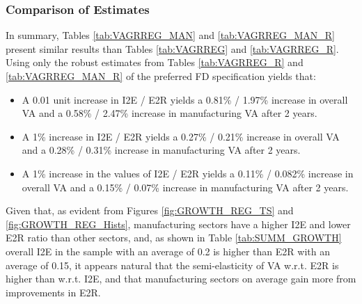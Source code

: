 \documentclass[a4paper]{article}
\begin{document}

\subsubsection{Comparison of Estimates}
In summary, Tables \ref{tab:VAGRREG_MAN} and \ref{tab:VAGRREG_MAN_R} present similar results than Tables \ref{tab:VAGRREG} and \ref{tab:VAGRREG_R}. Using only the robust estimates from Tables \ref{tab:VAGRREG_R} and \ref{tab:VAGRREG_MAN_R} of the preferred FD specification yields that:
\begin{itemize}
\item A 0.01 unit increase in I2E / E2R yields a 0.81\% / 1.97\% increase in overall VA and a 0.58\% / 2.47\% increase in manufacturing VA after 2 years.
\item A 1\% increase in I2E / E2R yields a 0.27\% / 0.21\% increase in overall VA and a 0.28\% / 0.31\% increase in manufacturing VA after 2 years.
\item A 1\% increase in the values of I2E / E2R yields a 0.11\% / 0.082\% increase in overall VA and a 0.15\% / 0.07\% increase in manufacturing VA after 2 years.
\end{itemize}

Given that, as evident from Figures \ref{fig:GROWTH_REG_TS} and \ref{fig:GROWTH_REG_Hists}, manufacturing sectors have a higher I2E and lower E2R ratio than other sectors, and, as shown in Table \ref{tab:SUMM_GROWTH} overall I2E in the sample with an average of 0.2 is higher than E2R with an average of 0.15, it appears natural that the semi-elasticity of VA w.r.t. E2R is higher than w.r.t. I2E, and that manufacturing sectors on average gain more from improvements in E2R. 
\end{document}
